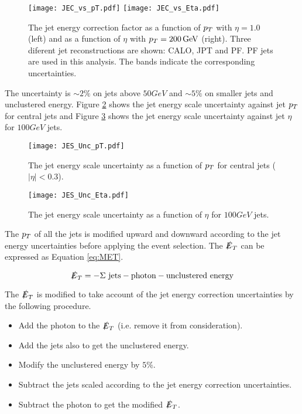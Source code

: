 \begin{figure}
\texttt{[image: JEC\_vs\_pT.pdf]}
\texttt{[image: JEC\_vs\_Eta.pdf]}
\caption{The jet energy correction factor as a function of $p_{T}$ with $\eta =
1.0$ (left) and as a function of $\eta$ with $p_{T} = 200 \, \mathrm{GeV}$ (right). 
Three diferent jet reconstructions are shown: CALO, JPT and PF. PF jets are used 
in this analysis. The bands indicate the corresponding uncertainties.}
\label{fig:JEC_vs_pT_And_Eta}
\end{figure}

The uncertainty is $\sim 2 \unit{\%}$ on jets above $50 \unit{GeV}$ and $\sim 5 
\unit{\%}$ on smaller jets and unclustered energy. Figure \ref{fig:JES_Unc_pT} 
shows the jet energy scale uncertainty against jet $p_{T}$ for central jets and 
Figure \ref{fig:JES_Unc_Eta} shows the jet energy scale uncertainty against jet
$\eta$ for $100\unit{GeV}$ jets. \\

\begin{figure}
\begin{center}
\texttt{[image: JES\_Unc\_pT.pdf]}
\end{center}
\caption{The jet energy scale uncertainty as a function of $p_{T}$ for
central jets ($|\eta| < 0.3$).}
\label{fig:JES_Unc_pT}
\end{figure}

\begin{figure}
\begin{center}
\texttt{[image: JES\_Unc\_Eta.pdf]}
\end{center}
\caption{The jet energy scale uncertainty as a function of $\eta$ for
$100\unit{GeV}$ jets.}
\label{fig:JES_Unc_Eta}
\end{figure}

The $p_{T}$ of all the jets is modified upward and downward according to the jet 
energy uncertainties before applying the event selection. The $\slashed{E}_{T}$ can be 
expressed as Equation \ref{eq:MET}.

\begin{equation}
\slashed{E}_{T} = -\Sigma \mbox{ jets} - \mbox{photon} - \mbox{unclustered energy}
\label{eq:MET}
\end{equation}

The $\slashed{E}_{T}$ is modified to take account of the jet energy correction
uncertainties by the following procedure. 

\begin{itemize}
\item Add the photon to the $\slashed{E}_{T}$ (i.e. remove it from consideration).
\item Add the jets also to get the unclustered energy.
\item Modify the unclustered energy by $5\unit{\%}$.
\item Subtract the jets scaled according to the jet energy correction 
uncertainties.
\item Subtract the photon to get the modified $\slashed{E}_{T}$.
\end{itemize}

